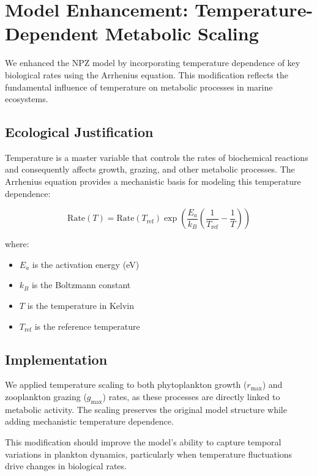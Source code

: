 \section{Model Enhancement: Temperature-Dependent Metabolic Scaling}

We enhanced the NPZ model by incorporating temperature dependence of key biological rates using the Arrhenius equation. This modification reflects the fundamental influence of temperature on metabolic processes in marine ecosystems.

\subsection{Ecological Justification}
Temperature is a master variable that controls the rates of biochemical reactions and consequently affects growth, grazing, and other metabolic processes. The Arrhenius equation provides a mechanistic basis for modeling this temperature dependence:

\[ \text{Rate}(T) = \text{Rate}(T_{\text{ref}}) \exp\left(\frac{E_a}{k_B}\left(\frac{1}{T_{\text{ref}}}-\frac{1}{T}\right)\right) \]

where:
\begin{itemize}
    \item $E_a$ is the activation energy (eV)
    \item $k_B$ is the Boltzmann constant
    \item $T$ is the temperature in Kelvin
    \item $T_{\text{ref}}$ is the reference temperature
\end{itemize}

\subsection{Implementation}
We applied temperature scaling to both phytoplankton growth ($r_{\text{max}}$) and zooplankton grazing ($g_{\text{max}}$) rates, as these processes are directly linked to metabolic activity. The scaling preserves the original model structure while adding mechanistic temperature dependence.

This modification should improve the model's ability to capture temporal variations in plankton dynamics, particularly when temperature fluctuations drive changes in biological rates.
